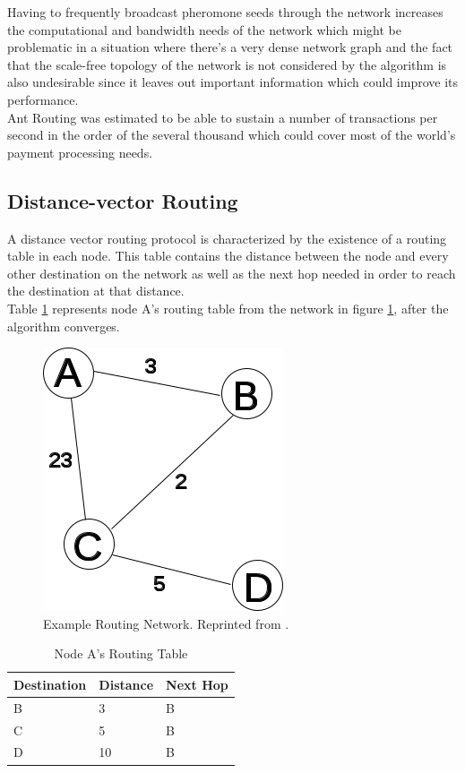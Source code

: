 Having to frequently broadcast pheromone seeds through the network increases the computational and bandwidth needs of the network which might be problematic in a situation where there's a very dense network graph and the fact that the scale-free topology of the network is not considered by the algorithm is also undesirable since it leaves out important information which could improve its performance. \\
Ant Routing was estimated to be able to sustain a number of transactions per second in the order of the several thousand \cite{ant_routing_scalability} which could cover most of the world's payment processing needs.

\subsection{Distance-vector Routing}
\label{ssec:distancevectorrouting}

A distance vector routing protocol is characterized by the existence of a routing table in each node. This table contains the distance between the node and every other destination on the network as well as the next hop needed in order to reach the destination at that distance. \\
Table \ref{table:dv_routing_table_a} represents node A's routing table from the network in figure \ref{fig:dv_networkabcd}, after the algorithm converges.

\begin{figure}[H]
\begin{center}
  \includegraphics[width=0.4\linewidth]{images/networkabcd.png}
  \caption{Example Routing Network. Reprinted from \cite{distance_vector}.}
  \label{fig:dv_networkabcd}
  \end{center}
\end{figure}

\begin{table}[H]
\parbox{.45\linewidth}{
\centering
\begin{tabular}{|l|l|l|}
\hline
\rowcolor[HTML]{C0C0C0} 
Destination & Distance & Next Hop \\ \hline
B           & 3    & B        \\ \hline
C           & 5    & B        \\ \hline
D           & 10   & B        \\ \hline
\end{tabular}
\caption{Node A's Routing Table}
\label{table:dv_routing_table_a}
}
\end{table}

